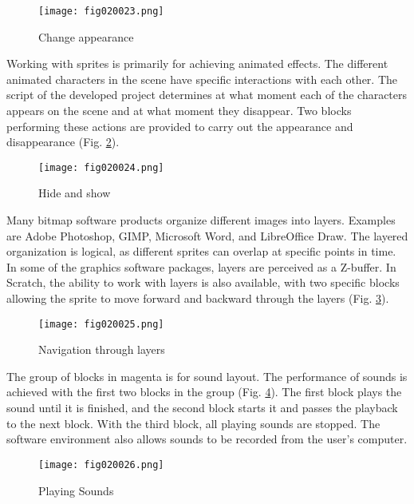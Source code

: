 \begin{figure}[H]
   \centering
   \texttt{[image: fig020023.png]}
   \caption{Change appearance}
\label{fig020023}
\end{figure}

Working with sprites is primarily for achieving animated effects. The different animated characters in the scene have specific interactions with each other. The script of the developed project determines at what moment each of the characters appears on the scene and at what moment they disappear. Two blocks performing these actions are provided to carry out the appearance and disappearance (Fig. \ref{fig020024}).

\begin{figure}[H]
   \centering
   \texttt{[image: fig020024.png]}
   \caption{Hide and show}
\label{fig020024}
\end{figure}

Many bitmap software products organize different images into layers. Examples are Adobe Photoshop, GIMP, Microsoft Word, and LibreOffice Draw. The layered organization is logical, as different sprites can overlap at specific points in time. In some of the graphics software packages, layers are perceived as a Z-buffer. In Scratch, the ability to work with layers is also available, with two specific blocks allowing the sprite to move forward and backward through the layers (Fig. \ref{fig020025}).

\begin{figure}[H]
   \centering
   \texttt{[image: fig020025.png]}
   \caption{Navigation through layers}
\label{fig020025}
\end{figure}

The group of blocks in magenta is for sound layout. The performance of sounds is achieved with the first two blocks in the group (Fig. \ref{fig020026}). The first block plays the sound until it is finished, and the second block starts it and passes the playback to the next block. With the third block, all playing sounds are stopped. The software environment also allows sounds to be recorded from the user's computer.

\begin{figure}[H]
   \centering
   \texttt{[image: fig020026.png]}
   \caption{Playing Sounds}
\label{fig020026}
\end{figure}

